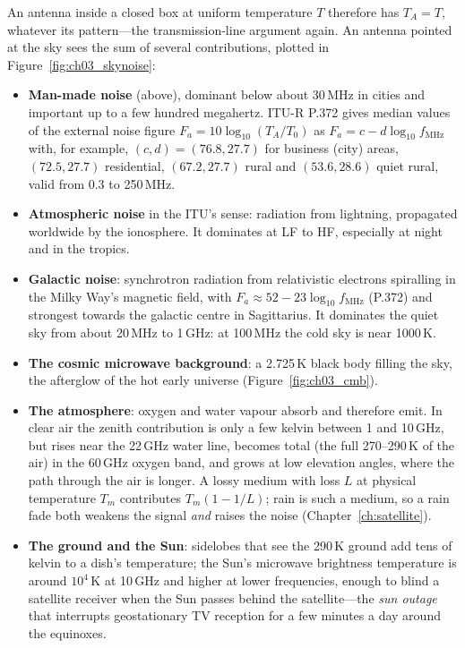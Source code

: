 An antenna inside a closed box at uniform temperature $T$ therefore has $T_A=T$, whatever its
pattern---the transmission-line argument again. An antenna pointed at the sky sees the sum of several
contributions, plotted in Figure~\ref{fig:ch03_skynoise}:
\begin{itemize}
\item \textbf{Man-made noise} (above), dominant below about 30\,MHz in cities and important up to a few
hundred megahertz. ITU-R P.372 gives median values of the external noise figure
$F_a=10\log_{10}(T_A/T_0)$ as $F_a=c-d\log_{10}f_{\text{MHz}}$ with, for example, $(c,d)=(76.8,27.7)$ for
business (city) areas, $(72.5,27.7)$ residential, $(67.2,27.7)$ rural and $(53.6,28.6)$ quiet rural,
valid from 0.3 to 250\,MHz.
\item \textbf{Atmospheric noise} in the ITU's sense: radiation from lightning, propagated worldwide by the
ionosphere. It dominates at LF to HF, especially at night and in the tropics.
\item \textbf{Galactic noise}: synchrotron radiation from relativistic electrons spiralling in the Milky
Way's magnetic field, with $F_a\approx52-23\log_{10}f_{\text{MHz}}$ (P.372) and strongest towards the
galactic centre in Sagittarius. It dominates the quiet sky from about 20\,MHz to 1\,GHz: at 100\,MHz the
cold sky is near 1000\,K.
\item \textbf{The cosmic microwave background}: a 2.725\,K black body filling the sky, the afterglow of the
hot early universe (Figure~\ref{fig:ch03_cmb}).
\item \textbf{The atmosphere}: oxygen and water vapour absorb and therefore emit. In clear air the zenith
contribution is only a few kelvin between 1 and 10\,GHz, but rises near the 22\,GHz water line, becomes
total (the full 270--290\,K of the air) in the 60\,GHz oxygen band, and grows at low elevation angles,
where the path through the air is longer. A lossy medium with loss $L$ at physical temperature $T_m$
contributes $T_m(1-1/L)$; rain is such a medium, so a rain fade both weakens the signal \emph{and} raises
the noise (Chapter~\ref{ch:satellite}).
\item \textbf{The ground and the Sun}: sidelobes that see the 290\,K ground add tens of kelvin to a dish's
temperature; the Sun's microwave brightness temperature is around $10^4$\,K at 10\,GHz and higher at lower
frequencies, enough to blind a satellite receiver when the Sun passes behind the satellite---the \emph{sun
outage} that interrupts geostationary TV reception for a few minutes a day around the equinoxes.
\end{itemize}

